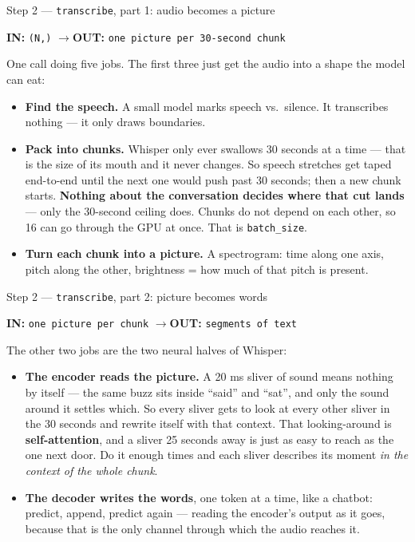 \documentclass[aspectratio=169]{beamer}
\newcommand{\shapebox}[2]{%
  \begin{center}
  \colorbox{black!8}{\parbox{0.9\textwidth}{\centering
  \textbf{IN:} \texttt{#1} \qquad$\longrightarrow$\qquad \textbf{OUT:} \texttt{#2}}}
  \end{center}}
\begin{document}
\begin{frame}{Step 2 --- \texttt{transcribe}, part 1: audio becomes a picture}

\shapebox{(N,)}{one picture per 30-second chunk}

One call doing five jobs. The first three just get the audio into a shape the model can eat:

\begin{itemize}
  \item \textbf{Find the speech.} A small model marks speech vs.\ silence. It transcribes
        nothing --- it only draws boundaries.
  \item \textbf{Pack into chunks.} Whisper only ever swallows 30 seconds at a time --- that
        is the size of its mouth and it never changes. So speech stretches get taped
        end-to-end until the next one would push past 30 seconds; then a new chunk starts.
        \textbf{Nothing about the conversation decides where that cut lands} --- only the
        30-second ceiling does. Chunks do not depend on each other, so 16 can go through the
        GPU at once. That is \texttt{batch\_size}.
  \item \textbf{Turn each chunk into a picture.} A spectrogram: time along one axis, pitch
        along the other, brightness = how much of that pitch is present.
\end{itemize}

\end{frame}

\begin{frame}{Step 2 --- \texttt{transcribe}, part 2: picture becomes words}

\shapebox{one picture per chunk}{segments of text}

The other two jobs are the two neural halves of Whisper:

\begin{itemize}
  \item \textbf{The encoder reads the picture.} A 20 ms sliver of sound means nothing by
        itself --- the same buzz sits inside ``said'' and ``sat'', and only the sound around
        it settles which. So every sliver gets to look at every other sliver in the 30
        seconds and rewrite itself with that context. That looking-around is
        \textbf{self-attention}, and a sliver 25 seconds away is just as easy to reach as
        the one next door. Do it enough times and each sliver describes its moment
        \emph{in the context of the whole chunk}.
  \item \textbf{The decoder writes the words}, one token at a time, like a chatbot: predict,
        append, predict again --- reading the encoder's output as it goes, because that is
        the only channel through which the audio reaches it.
\end{itemize}

\end{frame}
\end{document}
